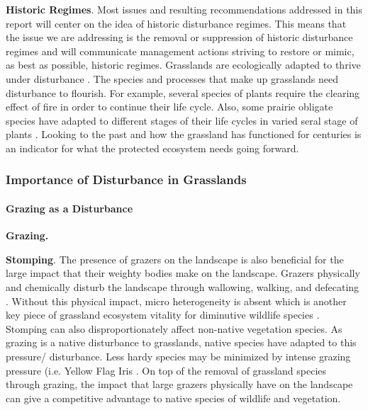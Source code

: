 \textbf{Historic Regimes}. 
Most issues and resulting recommendations addressed in this report will center on the idea of historic disturbance regimes. 
This means that the issue we are addressing is the removal or suppression of historic disturbance regimes and will communicate management actions striving to restore or mimic, as best as possible, historic regimes. 
Grasslands are ecologically adapted to thrive under disturbance \cite{samson2004}. 
The species and processes that make up grasslands need disturbance to flourish. For example, several species of plants require the clearing effect of fire in order to continue their life cycle. 
Also, some prairie obligate species have adapted to different stages of their life cycles in varied seral stage of plants \citep{ricketts2016}. 
Looking to the past and how the grassland has functioned for centuries is an indicator for what the protected ecosystem needs going forward.

\hypertarget{importance-of-disturbance-in-grasslands}{%
	\subsubsection{Importance of Disturbance in
		Grasslands}\label{importance-of-disturbance-in-grasslands}}

\hypertarget{grazing-as-a-disturbance}{%
	\paragraph{Grazing as a Disturbance}\label{grazing-as-a-disturbance}}

\textbf{Grazing. }

\textbf{Stomping}. 
The presence of grazers on the landscape is also beneficial for the large impact that their weighty bodies make on the landscape. 
Grazers physically and chemically disturb the landscape through wallowing, walking, and defecating \citep{allred2011}. 
Without this physical impact, micro heterogeneity is absent which is another key piece of grassland ecosystem vitality for diminutive wildlife species \citep{fuhlendorf2017}. 
Stomping can also disproportionately affect non-native vegetation species. 
As grazing is a native disturbance to grasslands, native species have adapted to this pressure/ disturbance.
Less hardy species may be minimized by intense grazing pressure (i.e. Yellow Flag Iris \citep{spaak2016}. 
On top of the removal of grassland species through grazing, the impact that large grazers physically have on the landscape can give a competitive advantage to native species of wildlife and vegetation.

